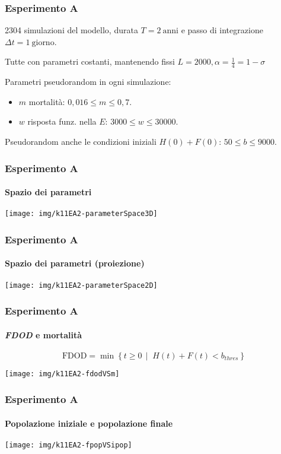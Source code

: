 \documentclass[]{beamer}
\newcommand{\st}{\,\mid\;}
\begin{document}
\begin{frame}
    \frametitle{Esperimento A}

    2304 simulazioni del modello,
    durata $T=2~\text{anni}$ e passo di integrazione $\Delta t= 1~\text{giorno}$.

    \pause
    Tutte con parametri costanti, mantenendo fissi $L=2000, \alpha = \frac{1}{4} = 1-\sigma$

    \pause
    Parametri pseudorandom in ogni simulazione:
    \begin{itemize}
        \item $m$ mortalità: \pause $0,016 \leq m \leq 0,7$.
        \item \pause $w$ risposta funz. nella $E$: \pause $3000 \leq w \leq 30000$.
    \end{itemize}
    \pause
    Pseudorandom anche le condizioni iniziali $H(0)+F(0)$: \pause $50 \leq b \leq 9000$.
\end{frame}

\begin{frame}
    \frametitle{Esperimento A}
    \framesubtitle{Spazio dei parametri}

    \begin{center}
        \texttt{[image: img/k11EA2-parameterSpace3D]}
    \end{center}
\end{frame}

\begin{frame}
    \frametitle{Esperimento A}
    \framesubtitle{Spazio dei parametri (proiezione)}

    \begin{center}
        \texttt{[image: img/k11EA2-parameterSpace2D]}
    \end{center}
\end{frame}

\begin{frame}
    \frametitle{Esperimento A}
    \framesubtitle{\emph{FDOD} e mortalità}

    $$\text{FDOD} = \min \left\{ t \geq 0 \st H(t) + F(t) < b_{thres} \right\}$$

    \pause
    \begin{center}
        \texttt{[image: img/k11EA2-fdodVSm]}
    \end{center}
\end{frame}

\begin{frame}
    \frametitle{Esperimento A}
    \framesubtitle{Popolazione iniziale e popolazione finale}

    \begin{center}
        \texttt{[image: img/k11EA2-fpopVSipop]}
    \end{center}
\end{frame}
\end{document}
